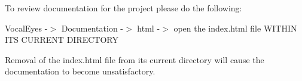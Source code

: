 To review documentation for the project please do the following\+:

Vocal\+Eyes -\/$>$ Documentation -\/$>$ html -\/$>$ open the index.\+html file WITHIN ITS CURRENT DIRECTORY

Removal of the index.\+html file from its current directory will cause the documentation to become unsatisfactory. 